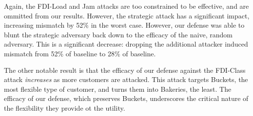 Again, the FDI-Load and Jam attacks are too constrained to be effective, and are ommitted from our results.  However, the strategic attack has a significant impact, increasing mismatch by 52\% in the worst case.  However, our defense was able to blunt the strategic adversary back down to the efficacy of the naive, random adversary.  This is a significant decrease: dropping the additional attacker induced mismatch from 52\% of baseline to 28\% of baseline. 

The other notable result is that the efficacy of our defense against the FDI-Class attack \emph{increases} as more customers are attacked.  This attack targets Buckets, the most flexible type of customer, and turns them into Bakeries, the least.  The efficacy of our defense, which preserves Buckets, underscores the critical nature of the flexibility they provide ot the utility.  

